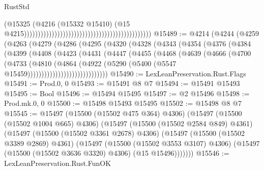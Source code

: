 \begin{lexlean}{RustStd}
\begin{coremodule}
                                                                                          (@15325
                                                                                            (@4216
                                                                                              (@15332
                                                                                                @15410)
                                                                                              (@15
                                                                                                @4215))))))))))))))))))))))))))))))))))))))))))))))
@15489 := @4214
    (@4244
      (@4259
        (@4263
          (@4279
            (@4286
              (@4295
                (@4320
                  (@4328
                    (@4343
                      (@4354
                        (@4376
                          (@4384
                            (@4399
                              (@4408
                                (@4423
                                  (@4431
                                    (@4447
                                      (@4455
                                        (@4468
                                          (@4639
                                            (@4666
                                              (@4700
                                                (@4733
                                                  (@4810
                                                    (@4864
                                                      (@4922
                                                        (@5290
                                                          (@5400
                                                            (@5547
                                                              @15459)))))))))))))))))))))))))))))
@15490 := LexLeanPreservation.Rust.Flags
@15491 := Prod.{0, 0}
@15493 := @15491 @8 @7
@15494 := @15491 @15493
@15495 := Bool
@15496 := @15494 @15495
@15497 := @2 @15496
@15498 := Prod.mk.{0, 0}
@15500 := @15498 @15493 @15495
@15502 := @15498 @8 @7
@15545 := @15497
    (@15500 (@15502 @475 @364) @4306)
    (@15497
      (@15500 (@15502 @1004 @665) @4306)
      (@15497
        (@15500 (@15502 @2584 @849) @4361)
        (@15497
          (@15500 (@15502 @3361 @2678) @4306)
          (@15497
            (@15500 (@15502 @3389 @2869) @4361)
            (@15497
              (@15500 (@15502 @3553 @3107) @4306)
              (@15497 (@15500 (@15502 @3636 @3320) @4306) (@15 @15496)))))))
@15546 := LexLeanPreservation.Rust.FunOK

\end{coremodule}
\end{lexlean}
